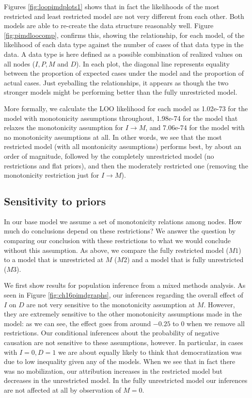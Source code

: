 \documentclass[
  12pt,
]{book}
\begin{document}
Figures \ref{fig:loopimdplots1} shows that in fact the likelihoods of the most restricted and least restricted model are not very different from each other. Both models are able to re-create the data structure reasonably well. Figure \ref{fig:pimdloocomp}, confirms this, showing the relationship, for each model, of the likelihood of each data type against the number of cases of that data type in the data. A data type is here defined as a possible combination of realized values on all nodes (\(I, P, M\) and \(D\)). In each plot, the diagonal line represents equality between the proportion of expected cases under the model and the proportion of actual cases. Just eyeballing the relationships, it appears as though the two stronger models might be performing better than the fully unrestricted model.

More formally, we calculate the LOO likelihood for each model as 1.02e-73 for the model with monotonicity assumptions throughout, 1.98e-74 for the model that relaxes the monotonicity assumption for \(I \rightarrow M\), and 7.06e-74 for the model with no monotonicity assumptions at all. In other words, we see that the most restricted model (with all montonicity assumptions) performs best, by about an order of magnitude, followed by the completely unrestricted model (no restrictions and flat priors), and then the moderately restricted one (removing the monotonicity restriction just for \(I \rightarrow M\)).

\hypertarget{sensitivity-to-priors}{%
\subsection{Sensitivity to priors}\label{sensitivity-to-priors}}

In our base model we assume a set of monotonicity relations among nodes. How much do conclusions depend on these restrictions? We answer the question by comparing our conclusion with these restrictions to what we would conclude without this assumption. As above, we compare the fully restricted model (\(M1\)) to a model that is unrestricted at \(M\) (\(M2\)) and a model that is fully unrestricted (\(M3\)).

We first show results for population inference from a mixed methods analysis. As seen in Figure \ref{fig:ch16pimdgraphs}, our inferences regarding the overall effect of \(I\) on \(D\) are not very sensitive to the monotonicity assumption at \(M\). However, they are extremely sensitive to the other monotonicity assumptions made in the model: as we can see, the effect goes from around \(-0.25\) to \(0\) when we remove all restrictions. Our conditional inferences about the probability of negative causation are not sensitive to these assumptions, however. In particular, in cases with \(I=0, D=1\) we are about equally likely to think that democratization was due to low inequality given any of the models. When we see that in fact there was no mobilization, our attribution increases in the restricted model but decreases in the unrestricted model. In the fully unrestricted model our inferences are not affected at all by observation of \(M=0\).
\end{document}
